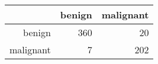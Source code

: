 \begin{tabular}{rrr}
  \hline
 & benign & malignant \\ 
  \hline
benign & 360 &  20 \\ 
  malignant &   7 & 202 \\ 
   \hline
\end{tabular}
